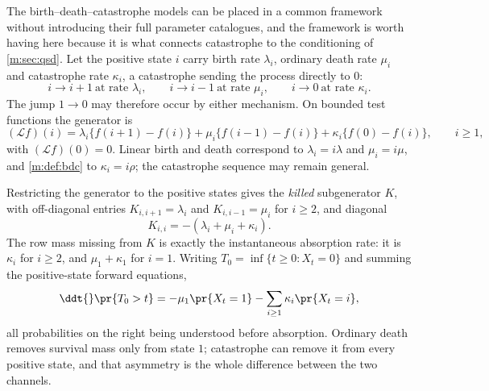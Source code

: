The birth--death--catastrophe models can be placed in a common framework without
introducing their full parameter catalogues, and the framework is worth having here
because it is what connects catastrophe to the conditioning of \cref{m:sec:qsd}. Let
the positive state $i$ carry birth rate $\lambda_i$, ordinary death rate $\mu_i$
and catastrophe rate $\kappa_i$, a catastrophe sending the process directly to $0$:
\begin{equation}
\label{m:eq:bdcgeneralrates}
i\longrightarrow i+1 \ \text{at rate }\lambda_i,
\qquad
i\longrightarrow i-1 \ \text{at rate }\mu_i,
\qquad
i\longrightarrow 0 \ \text{at rate }\kappa_i .
\end{equation}
The jump $1\to0$ may therefore occur by either mechanism. On bounded test functions
the generator is
\begin{equation}
\label{m:eq:bdcgenerator}
(\mathcal Lf)(i)
= \lambda_i\{f(i+1)-f(i)\} + \mu_i\{f(i-1)-f(i)\} + \kappa_i\{f(0)-f(i)\},
\qquad i\ge1,
\end{equation}
with $(\mathcal Lf)(0)=0$. Linear birth and death correspond to
$\lambda_i = i\lambda$ and $\mu_i = i\mu$, and \cref{m:def:bdc} to
$\kappa_i = i\rho$; the catastrophe sequence may remain general.

Restricting the generator to the positive states gives the \emph{killed}
subgenerator $K$, with off-diagonal entries $K_{i,i+1}=\lambda_i$ and
$K_{i,i-1}=\mu_i$ for $i\ge2$, and diagonal
\begin{equation}
\label{m:eq:killedsubgen}
K_{i,i} = -(\lambda_i+\mu_i+\kappa_i) .
\end{equation}
The row mass missing from $K$ is exactly the instantaneous absorption rate: it is
$\kappa_i$ for $i\ge2$, and $\mu_1+\kappa_1$ for $i=1$. Writing
$T_0 = \inf\{t\ge0 : X_t = 0\}$ and summing the positive-state forward equations,
\begin{equation}
\label{m:eq:bdcsurvivalloss}
\ddt{}\pr{T_0>t}
= -\mu_1\pr{X_t=1} - \sum_{i\ge1}\kappa_i\pr{X_t=i},
\end{equation}
all probabilities on the right being understood before absorption. Ordinary death
removes survival mass only from state $1$; catastrophe can remove it from every
positive state, and that asymmetry is the whole difference between the two channels.

